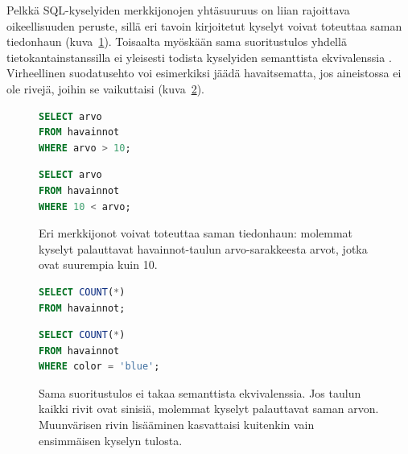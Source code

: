 Pelkkä SQL-kyselyiden merkkijonojen yhtäsuuruus
on liian rajoittava oikeellisuuden peruste,
sillä eri tavoin kirjoitetut kyselyt voivat
toteuttaa saman tiedonhaun
(kuva~\ref{fig:eri-merkkijonot}). Toisaalta myöskään
sama suoritustulos yhdellä tietokantainstanssilla
ei yleisesti todista kyselyiden semanttista
ekvivalenssia \cite{zhong2020semantic}. Virheellinen
suodatusehto voi esimerkiksi jäädä havaitsematta,
jos aineistossa ei ole rivejä, joihin se vaikuttaisi
(kuva~\ref{fig:sama-suoritustulos}).

\begin{figure}[htbp]
  \centering
  \begin{minipage}[t]{0.47\textwidth}
\begin{lstlisting}[language=SQL,basicstyle=\ttfamily\small]
SELECT arvo
FROM havainnot
WHERE arvo > 10;
\end{lstlisting}
  \end{minipage}
  \hfill
  \begin{minipage}[t]{0.47\textwidth}
\begin{lstlisting}[language=SQL,basicstyle=\ttfamily\small]
SELECT arvo
FROM havainnot
WHERE 10 < arvo;
\end{lstlisting}
  \end{minipage}
  \caption{Eri merkkijonot voivat toteuttaa saman
    tiedonhaun: molemmat kyselyt palauttavat
    havainnot-taulun arvo-sarakkeesta arvot,
  jotka ovat suurempia kuin 10.}
  \label{fig:eri-merkkijonot}
\end{figure}

\begin{figure}[htbp]
  \centering
  \begin{minipage}[t]{0.47\textwidth}
\begin{lstlisting}[language=SQL,basicstyle=\ttfamily\small]
SELECT COUNT(*)
FROM havainnot;
\end{lstlisting}
  \end{minipage}
  \hfill
  \begin{minipage}[t]{0.47\textwidth}
\begin{lstlisting}[language=SQL,basicstyle=\ttfamily\small]
SELECT COUNT(*)
FROM havainnot
WHERE color = 'blue';
\end{lstlisting}
  \end{minipage}
  \caption{Sama suoritustulos ei takaa semanttista
    ekvivalenssia. Jos taulun kaikki rivit
    ovat sinisiä, molemmat kyselyt palauttavat saman arvon.
    Muunvärisen rivin lisääminen kasvattaisi kuitenkin
  vain ensimmäisen kyselyn tulosta.}
  \label{fig:sama-suoritustulos}
\end{figure}

